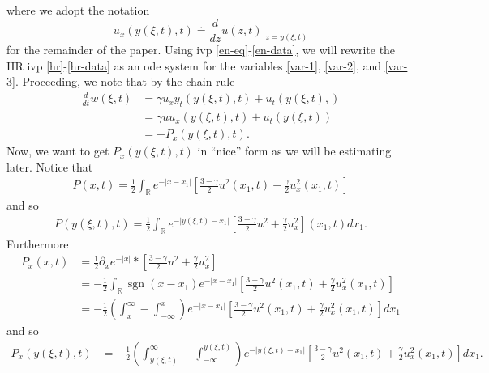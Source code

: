 \documentclass[12pt,reqno]{amsart}
\numberwithin{equation}{section}  %
\numberwithin{figure}{section}
\DeclareMathOperator{\sgn}{sgn}
\newcommand{\rr}{\mathbb{R}}
\newcommand{\p}{\partial}
\begin{document}
where we adopt the notation $$u_{x}(y(\xi, t),t) \doteq \frac{d}{dz}u(z,t) \big
|_{z = y(\xi, t)}$$ for the remainder of the paper. Using ivp
\eqref{en-eq}-\eqref{en-data}, we will rewrite the HR ivp
\eqref{hr}-\eqref{hr-data} as an ode system for the variables \eqref{var-1},
\eqref{var-2}, and \eqref{var-3}. Proceeding, we note that by the chain rule
%
%
\begin{equation}
\label{w-deriv}
\begin{split}
\frac{d}{dt}w(\xi, t)
& = \gamma u_{x} y_{t}(y(\xi, t), t) + u_{t}(y(\xi, t), )
\\
& = \gamma u u_{x}(y(\xi, t ), t) + u_{t}(y(\xi, t))
\\
& = -P_{x}(y(\xi, t), t).
\end{split}
\end{equation}
%
%
Now, we want to get $P_{x}(y(\xi, t), t)$ in ``nice'' form as we will be estimating later. Notice that
%
%
\begin{equation*}
\begin{split}
P(x,t) = \frac{1}{2} \int_{\rr}e^{-| x - x_{1} |} \left [\frac{3 - \gamma}{2}
u^{2}(x_{1}, t) + \frac{\gamma}{2} u_{x}^{2}(x_{1}, t) \right ]
\end{split}
\end{equation*}
%
%
and so 
%
%
\begin{equation}
\label{yuu}
\begin{split}
P(y(\xi, t), t) = \frac{1}{2} \int_{\rr} e^{-| y(\xi, t) - x_{1} |} \left [ \frac{3 - \gamma}{2} u^{2} + \frac{\gamma}{2}u_{x}^{2} \right ] (x_{1}, t) d x_{1}.
\end{split}
\end{equation}
%
%
Furthermore
%
%
\begin{equation}
\begin{split}
\label{p}
P_{x}(x,t)
& = \frac{1}{2}\p_{x} e^{-| x |}* \left [ \frac{3 - \gamma}{2} u^{2} + \frac{\gamma}{2} u_{x}^{2} \right ] 
\\
& = -\frac{1}{2} \int_{\rr} \sgn(x - x_{1}) e^{-| x - x_{1} |} \left [ \frac{3 - \gamma}{2} u^{2}(x_{1}, t) + \frac{\gamma}{2} u_{x}^{2}(x_{1}, t) \right ] 
\\
& =-\frac{1}{2} \left ( \int_{x}^{\infty} - \int_{-\infty}^{x} \right )
e^{-| x - x_{1} |} \left [ \frac{3 - \gamma}{2} u^{2}(x_{1}, t) +
\frac{\gamma}{2} u_{x}^{2}(x_{1}, t) \right ] dx_{1}
\end{split}
\end{equation}
%
%
and so%
%
\begin{equation}
\label{p-deriv}
\begin{split}
P_{x}(y(\xi, t), t)
& = -\frac{1}{2} \left ( \int_{y(\xi, t)}^{\infty} - \int_{-\infty}^{y(\xi, t)} \right ) e^{-| y(\xi, t) - x_{1} |} \left [ \frac{3 - \gamma}{2} u^{2}(x_{1}, t) +
\frac{\gamma}{2} u_{x}^{2}(x_{1}, t) \right ] dx_{1}.
\end{split}
\end{equation}
\end{document}
